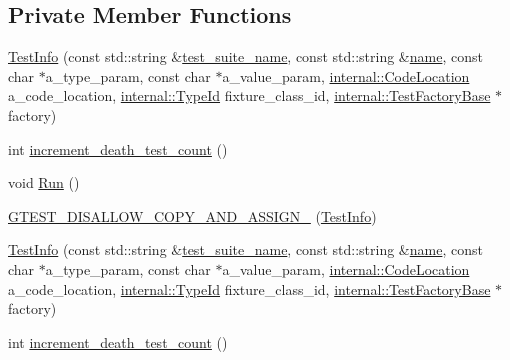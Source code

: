 \subsection*{Private Member Functions}
\begin{DoxyCompactItemize}
\item 
\mbox{\hyperlink{classtesting_1_1_test_info_aa652b2ec74957083637ece79297b274b}{Test\+Info}} (const std\+::string \&\mbox{\hyperlink{classtesting_1_1_test_info_a82a84ffd0e4d18eb5a3f97a2077e12cc}{test\+\_\+suite\+\_\+name}}, const std\+::string \&\mbox{\hyperlink{classtesting_1_1_test_info_ac2581b45eccc9a3b94cb41c4807d0e34}{name}}, const char $\ast$a\+\_\+type\+\_\+param, const char $\ast$a\+\_\+value\+\_\+param, \mbox{\hyperlink{structtesting_1_1internal_1_1_code_location}{internal\+::\+Code\+Location}} a\+\_\+code\+\_\+location, \mbox{\hyperlink{namespacetesting_1_1internal_a38c435cbab5f8b784e2e7f3356cab242}{internal\+::\+Type\+Id}} fixture\+\_\+class\+\_\+id, \mbox{\hyperlink{classtesting_1_1internal_1_1_test_factory_base}{internal\+::\+Test\+Factory\+Base}} $\ast$factory)
\item 
int \mbox{\hyperlink{classtesting_1_1_test_info_a70c9509202a6f95fbc26704ce13efb63}{increment\+\_\+death\+\_\+test\+\_\+count}} ()
\item 
void \mbox{\hyperlink{classtesting_1_1_test_info_ade784915e9be3a01e3a6ef509b77d6c9}{Run}} ()
\item 
\mbox{\hyperlink{classtesting_1_1_test_info_a49607d4547e374b5248e4200d9192817}{G\+T\+E\+S\+T\+\_\+\+D\+I\+S\+A\+L\+L\+O\+W\+\_\+\+C\+O\+P\+Y\+\_\+\+A\+N\+D\+\_\+\+A\+S\+S\+I\+G\+N\+\_\+}} (\mbox{\hyperlink{classtesting_1_1_test_info}{Test\+Info}})
\item 
\mbox{\hyperlink{classtesting_1_1_test_info_aa652b2ec74957083637ece79297b274b}{Test\+Info}} (const std\+::string \&\mbox{\hyperlink{classtesting_1_1_test_info_a82a84ffd0e4d18eb5a3f97a2077e12cc}{test\+\_\+suite\+\_\+name}}, const std\+::string \&\mbox{\hyperlink{classtesting_1_1_test_info_ac2581b45eccc9a3b94cb41c4807d0e34}{name}}, const char $\ast$a\+\_\+type\+\_\+param, const char $\ast$a\+\_\+value\+\_\+param, \mbox{\hyperlink{structtesting_1_1internal_1_1_code_location}{internal\+::\+Code\+Location}} a\+\_\+code\+\_\+location, \mbox{\hyperlink{namespacetesting_1_1internal_a38c435cbab5f8b784e2e7f3356cab242}{internal\+::\+Type\+Id}} fixture\+\_\+class\+\_\+id, \mbox{\hyperlink{classtesting_1_1internal_1_1_test_factory_base}{internal\+::\+Test\+Factory\+Base}} $\ast$factory)
\item 
int \mbox{\hyperlink{classtesting_1_1_test_info_a70c9509202a6f95fbc26704ce13efb63}{increment\+\_\+death\+\_\+test\+\_\+count}} ()

\end{DoxyCompactItemize}
